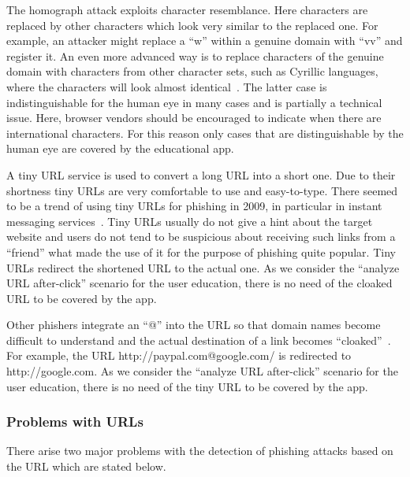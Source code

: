 \begin{description}[leftmargin=0cm]
	\item[Homograph Attack] The homograph attack exploits character resemblance.
 Here characters are replaced by other characters which look very similar to the replaced one.
 For example, an attacker might replace a ``w'' within a genuine domain with ``vv'' and register it.
 An even more advanced way is to replace characters of the genuine domain with characters from other character sets, such as Cyrillic languages, where the characters will look almost identical~\cite{gabrilovich2002homograph}. The latter case is indistinguishable for the human eye in many cases and is partially a technical issue.
Here, browser vendors should be encouraged to indicate when there are international characters.
 For this reason only cases that are distinguishable by the human eye are covered by the educational app.

	\item[Tiny URLs] A tiny URL service is used to convert a long URL into a short one.
 Due to their shortness tiny URLs are very comfortable to use and easy-to-type.
 There seemed to be a trend of using tiny URLs for phishing in 2009, in particular in instant messaging services~\cite{tinyurlpcworld}.
 Tiny URLs usually do not give a hint about the target website and users do not tend to be suspicious about receiving such links from a ``friend'' what made the use of it for the purpose of phishing quite popular. Tiny URLs redirect the shortened URL to the actual one.
 As we consider the ``analyze URL after-click'' scenario for the user education, there is no need of the cloaked URL to be covered by the app.

		\item[Cloaked URLs] Other phishers integrate an ``@'' into the URL so that domain names become difficult to understand and the actual destination of a link becomes ``cloaked''~\cite{alnajim2009fighting}. For example, the URL http://paypal.com@google.com/ is redirected to http://google.com. 
As we consider the ``analyze URL after-click'' scenario for the user education, there is no need of the tiny URL to be covered by the app.

\end{description}

\subsubsection{Problems with URLs}
\label{s:problems_with_URLs}
There arise two major problems with the detection of phishing attacks based on the URL which are stated below. 

